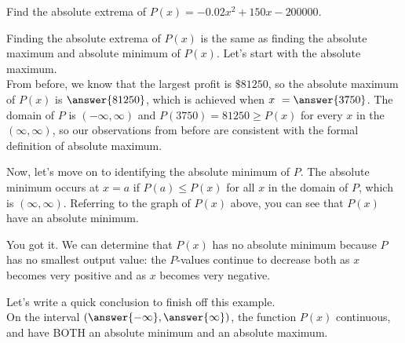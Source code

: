 \documentclass{ximera}
\begin{document}
\begin{example}
Find the absolute extrema of $P(x) = -0.02x^2 + 150x-200000$.
\begin{explanation}
Finding the absolute extrema of $P(x)$ is the same as finding the absolute maximum and absolute minimum of $P(x)$.  Let's start with the absolute maximum.  \\

From before, we know that the largest profit is $\$81250$, so the absolute maximum of $P(x)$ is $\answer{81250}$, which is achieved when $x \ = \answer{3750}$.  The domain of $P$ is $(-\infty, \infty)$ and $P(3750) = 81250 \geq P(x)$ for every $x$ in the $(\infty, \infty)$, so our observations from before are consistent with the formal definition of absolute maximum. \\

\begin{explanation}

Now, let's move on to identifying the absolute minimum of $P$.  The absolute minimum occurs at $x=a$ if $P(a) \leq P(x)$ for all $x$ in the domain of $P$, which is $(\infty, \infty)$.  Referring to the graph of $P(x)$ above, you can see that $P(x)$  have an absolute minimum. 

\begin{feedback}[correct]
You got it.  We can determine that $P(x)$ has no absolute minimum because $P$ has no smallest output value: the $P$-values continue to decrease both as $x$ becomes very positive and as $x$ becomes very negative. 
\end{feedback}

\begin{explanation}

Let's write a quick conclusion to finish off this example. \\

On the  interval $( \answer{-\infty}, \answer{\infty} )$, the function $P(x)$  continuous, and  have BOTH an absolute minimum and an absolute maximum.  

\end{explanation}

\end{explanation}

\end{explanation}

\end{example}
\end{document}

